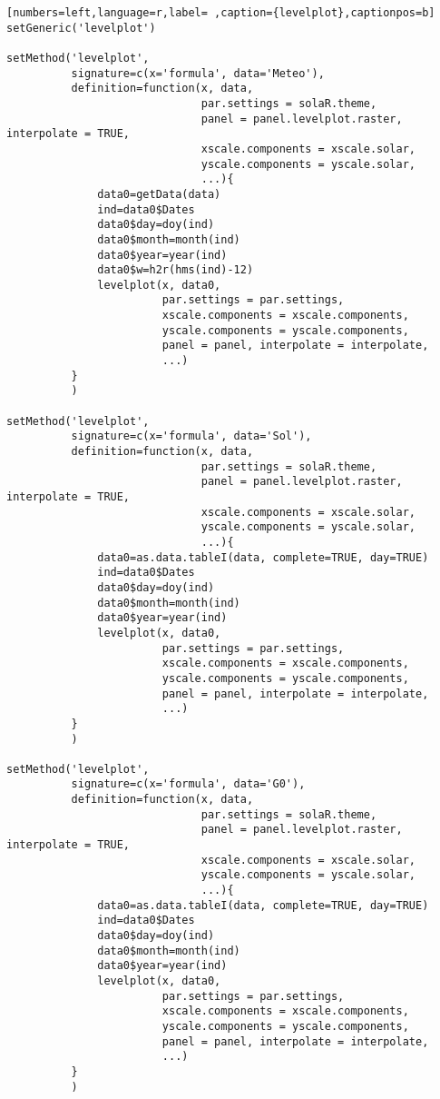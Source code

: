 \begin{lstlisting}[numbers=left,language=r,label= ,caption={levelplot},captionpos=b]
setGeneric('levelplot')

setMethod('levelplot',
          signature=c(x='formula', data='Meteo'),
          definition=function(x, data,
                              par.settings = solaR.theme,
                              panel = panel.levelplot.raster, interpolate = TRUE,
                              xscale.components = xscale.solar,
                              yscale.components = yscale.solar,
                              ...){
              data0=getData(data)
              ind=data0$Dates
              data0$day=doy(ind)
              data0$month=month(ind)
              data0$year=year(ind)
              data0$w=h2r(hms(ind)-12)
              levelplot(x, data0,
                        par.settings = par.settings,
                        xscale.components = xscale.components,
                        yscale.components = yscale.components,
                        panel = panel, interpolate = interpolate,
                        ...)
          }
          )

setMethod('levelplot',
          signature=c(x='formula', data='Sol'),
          definition=function(x, data,
                              par.settings = solaR.theme,
                              panel = panel.levelplot.raster, interpolate = TRUE,
                              xscale.components = xscale.solar,
                              yscale.components = yscale.solar,
                              ...){
              data0=as.data.tableI(data, complete=TRUE, day=TRUE)
              ind=data0$Dates
              data0$day=doy(ind)
              data0$month=month(ind)
              data0$year=year(ind)
              levelplot(x, data0,
                        par.settings = par.settings,
                        xscale.components = xscale.components,
                        yscale.components = yscale.components,
                        panel = panel, interpolate = interpolate,
                        ...)
          }
          )

setMethod('levelplot',
          signature=c(x='formula', data='G0'),
          definition=function(x, data,
                              par.settings = solaR.theme,
                              panel = panel.levelplot.raster, interpolate = TRUE,
                              xscale.components = xscale.solar,
                              yscale.components = yscale.solar,
                              ...){
              data0=as.data.tableI(data, complete=TRUE, day=TRUE)
              ind=data0$Dates
              data0$day=doy(ind)
              data0$month=month(ind)
              data0$year=year(ind)
              levelplot(x, data0, 
                        par.settings = par.settings,
                        xscale.components = xscale.components,
                        yscale.components = yscale.components,
                        panel = panel, interpolate = interpolate,
                        ...)
          }
          )
\end{lstlisting}
